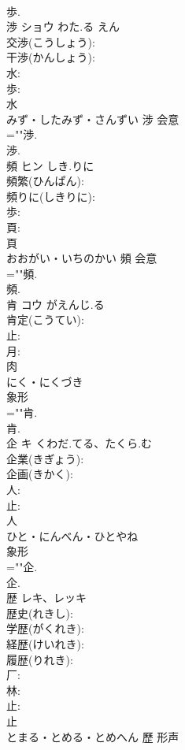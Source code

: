 \documentclass[8pt]{extreport}
\begin{document}
\begin{CJK}{UTF8}{min}
\\	歩.
\\	渉	ショウ	わた.る	えん	
\\	交渉(こうしょう): 
\\	干渉(かんしょう): 
\\	水: 
\\	歩: 
\\	水	
\\	みず・したみず・さんずい	涉	会意 
\\	=""渉.
\\	渉.
\\	頻	ヒン	しき.りに		
\\	頻繁(ひんぱん): 
\\	頻りに(しきりに): 
\\	歩: 
\\	頁: 
\\	頁	
\\	おおがい・いちのかい	頻	会意 
\\	=""頻.
\\	頻.
\\	肯	コウ	がえんじ.る		
\\	肯定(こうてい): 
\\	止: 
\\	月: 
\\	肉	
\\	にく・にくづき	
\\	象形 
\\	=""肯.
\\	肯.
\\	企	キ	くわだ.てる、たくら.む		
\\	企業(きぎょう): 
\\	企画(きかく): 
\\	人: 
\\	止: 
\\	人	
\\	ひと・にんべん・ひとやね	
\\	象形 
\\	=""企.
\\	企.
\\	歴	レキ、レッキ			
\\	歴史(れきし): 
\\	学歴(がくれき): 
\\	経歴(けいれき): 
\\	履歴(りれき): 
\\	厂: 
\\	林: 
\\	止: 
\\	止	
\\	とまる・とめる・とめへん	歷	形声 

\end{CJK}
\end{document}
